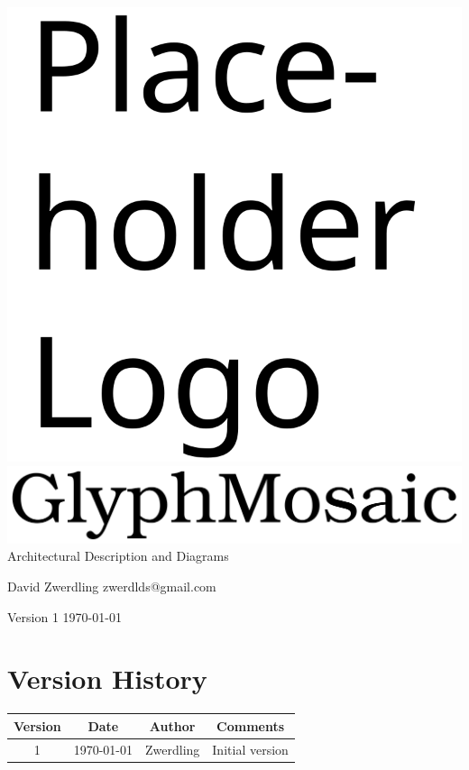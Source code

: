 \documentclass{article}
\newcommand{\docauth}[2]{
  \raggedright
  \Large
  {#1} \newline
  \small
  {#2}
  \vspace{1.5em}
  \newline
  \normalsize
}
\begin{document}
\begin{titlepage}
  \begin{center}
    \includegraphics[width=\textwidth]{../../Logo.svg}
    \includegraphics[width=\textwidth]{../../Wordmark.svg}
    \LARGE
    Architectural Description and Diagrams
  \end{center}

  \vfill

  \docauth{David Zwerdling}{zwerdlds@gmail.com}

  \vspace{1em}

  \large
  Version 1 \newline
  \today
  \normalsize
\end{titlepage}
\restoregeometry

\newpage

\section{Version History}
\begin{adjustbox}{width=\textwidth}
  \begin{tabular}{ |c|c|c|c| }
    \hline
    Version & Date   & Author      & Comments          \\
    \hline
    \hline
    1       & \today & {Zwerdling} & {Initial version} \\
    \hline
  \end{tabular}
\end{adjustbox}
\newpage
\end{document}
